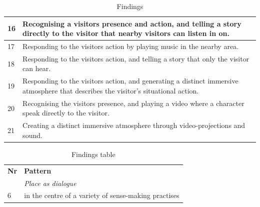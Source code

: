 \begin{table}[h]
\begin{tabular}{| p{1cm} | p{11cm}| }
\hline
16 & Recognising a visitors presence and action, and telling a story directly to the visitor that nearby visitors can listen in on. \\
\hline
17 & Responding to the visitors action by playing music in the nearby area. \\
\hline
18 & Responding to the visitors action, and telling a story that only the visitor can hear. \\
\hline
19 & Responding to the visitors action, and generating a distinct immersive atmosphere that describes the visitor's situational action.\\
\hline
20 & Recognising the visitors presence, and playing a video where a character speak directly to the visitor. \\
\hline
21 & Creating a distinct immersive atmosphere through video-projections and sound.  \\
\hline
\end{tabular}
\caption{Findings}
\label{tab:abc}
\end{table}



\begin{table}[h]
\centering
\begin{tabular}{| p{1cm} | p{11cm}| }
\hline
\textbf{Nr} & \textbf{Pattern} \\
& \textit{Place as dialogue }\\
\hline
6 & in the centre of a variety of sense-making practises \\
\hline

\end{tabular}
\caption{Findings table}
\label{tab:abc}
\end{table}

